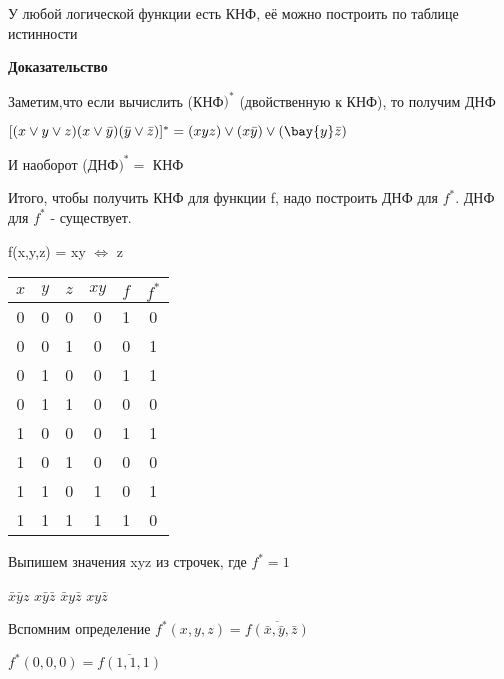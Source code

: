 \documentclass[russian]{lecture-notes}
\begin{document}
	\begin{definition}
		У любой логической функции есть КНФ, её можно построить по таблице истинности
		\end{definition}

	\textbf{Доказательство}

		Заметим,что если вычислить (КНФ$)^{*}$ (двойственную к КНФ), то получим ДНФ

	\begin{example}
	$[(x \vee y \vee z)(x \vee \bar{y})(\bar{y} \vee \bar{z})]^{*} = (xyz)\vee(x\bar{y})\vee(\bay{y}\bar{z})$

		И наоборот (ДНФ$)^{*} = $ КНФ
		\end{example}

	Итого, чтобы получить КНФ для функции f, надо построить ДНФ для $f^{*}$. ДНФ для $f^{*}$
	- существует.

	\begin{example}
		f(x,y,z) = xy $\Leftrightarrow$ z

		\begin{table}[h!]
	\centering
	\begin{tabular}{|c|c|c|c|c|c|}
		\hline
		$x$ & $y$ & $z$ & $xy$ & $f$ & $f^{*}$ \\ \hline
		0 & 0 & 0 & 0   & 1   & 0   \\ \hline
		0 & 0 & 1 & 0   & 0   & 1   \\ \hline
		0 & 1 & 0 & 0   & 1   & 1   \\ \hline
		0 & 1 & 1 & 0   & 0   & 0   \\ \hline
		1 & 0 & 0 & 0   & 1   & 1   \\ \hline
		1 & 0 & 1 & 0   & 0   & 0   \\ \hline
		1 & 1 & 0 & 1   & 0   & 1   \\ \hline
		1 & 1 & 1 & 1   & 1   & 0   \\ \hline
	\end{tabular}

\end{table}


			Выпишем значения xyz из строчек, где $f^{*} = 1$

			$\bar{x}\bar{y}z$ \quad $x\bar{y}\bar{z}$ \quad $\bar{x}y\bar{z}$ \quad $xy\bar{z}$


		\end{example}

	Вспомним определение $f^{*}(x,y,z) = \overline{f(\bar{x},\bar{y},\bar{z})}$

	$f^{*}(0,0,0) = \overline{f(1,1,1)}$
\end{document}
